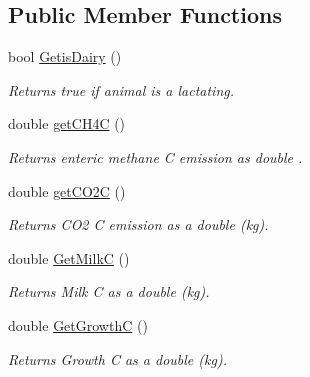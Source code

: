 \subsection*{Public Member Functions}
\begin{DoxyCompactItemize}
\item 
\mbox{\label{classlivestock_a1c4aab24ce56140e9c81ea03037c7f61}} 
bool \mbox{\hyperlink{classlivestock_a1c4aab24ce56140e9c81ea03037c7f61}{Getis\+Dairy}} ()
\begin{DoxyCompactList}\small\item\em Returns true if animal is a lactating. \end{DoxyCompactList}\item 
\mbox{\label{classlivestock_a8dc55a0cba9604b37b2e458dd4754966}} 
double \mbox{\hyperlink{classlivestock_a8dc55a0cba9604b37b2e458dd4754966}{get\+C\+H4C}} ()
\begin{DoxyCompactList}\small\item\em Returns enteric methane C emission as double . \end{DoxyCompactList}\item 
\mbox{\label{classlivestock_a20a18f7a7c6e04d1f851eccf01cefb25}} 
double \mbox{\hyperlink{classlivestock_a20a18f7a7c6e04d1f851eccf01cefb25}{get\+C\+O2C}} ()
\begin{DoxyCompactList}\small\item\em Returns C\+O2 C emission as a double (kg). \end{DoxyCompactList}\item 
\mbox{\label{classlivestock_a2d1f6bb0b58f669ccebb29a642221688}} 
double \mbox{\hyperlink{classlivestock_a2d1f6bb0b58f669ccebb29a642221688}{Get\+MilkC}} ()
\begin{DoxyCompactList}\small\item\em Returns Milk C as a double (kg). \end{DoxyCompactList}\item 
\mbox{\label{classlivestock_a97877b7ae61e64a6f2d38d4f23fcec6f}} 
double \mbox{\hyperlink{classlivestock_a97877b7ae61e64a6f2d38d4f23fcec6f}{Get\+GrowthC}} ()
\begin{DoxyCompactList}\small\item\em Returns Growth C as a double (kg). \end{DoxyCompactList}\item 

\end{DoxyCompactItemize}
